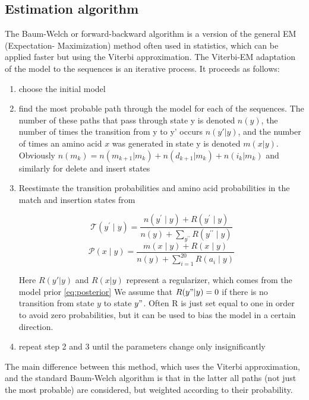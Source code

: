 \subsection{Estimation algorithm}
The Baum-Welch or forward-backward algorithm is a version of the general EM (Expectation- Maximization) method often used in statistics, which can be applied faster but using the Viterbi approximation.
The Viterbi-EM adaptation of the model to the sequences is an iterative process.
It proceeds as follows:
\begin{enumerate}
\item choose the initial model
\item find the most probable path through the model for each of the sequences. The number of these paths that pass through state y is denoted $n(y)$, the number of times the transition from y to y' occurs $n(y'|y)$, and the number of times an amino acid $x$ was generated in state y is denoted $m(x|y)$. Obviously $n(m_k) = n(m_{k+1}|m_k)+n(d_{k+1} | m_k)+n(i_k|m_k)$ and similarly for delete and insert states
\item Reestimate the transition probabilities and amino acid probabilities in the match and insertion states from

\begin{equation}\label{eq:T}
\mathcal{T}\left(y^{\prime} \mid y\right) =\frac{n\left(y^{\prime} \mid y\right)+R\left(y^{\prime} \mid y\right)}{n(y)+\sum_{y^{\prime \prime}} R\left(y^{\prime \prime} \mid y\right)}
\end{equation}
\begin{equation}\label{eq:P}
\mathcal{P}(x \mid y) =\frac{m(x \mid y)+R(x \mid y)}{n(y)+\sum_{i=1}^{20} R\left(a_{i} \mid y\right)}
\end{equation}

Here $R(y'|y)$ and $R(x|y)$ represent a regularizer, which comes from the model prior \ref{eq:posterior} We assume that $R(y"|y) = 0$ if there is no transition from state $y$ to state $y"$. Often R is just set equal to one in order to avoid zero probabilities, but it can be used to bias the model in a certain direction.
\item repeat step 2 and 3 until the parameters change only insignificantly
\end{enumerate}
The main difference between this method, which uses the Viterbi approximation, and the standard Baum-Welch algorithm is that in the latter all paths (not just the most probable) are considered, but weighted according to their probability.

